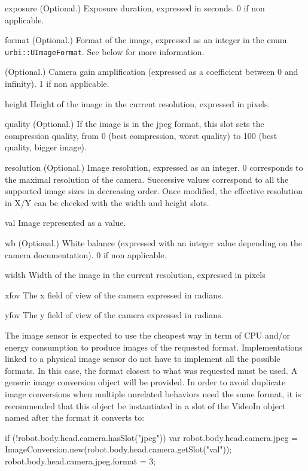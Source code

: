 \begin{urbiscriptapi}
\item[exposure]{} (Optional.) Exposure duration, expressed in seconds. 0 if
  non applicable.


\item[format]{} (Optional.)  Format of the image, expressed as an integer in
  the enum \lstinline{urbi::UImageFormat}.  See below for more information.


\item[gain]{} (Optional.)  Camera gain amplification (expressed as a
  coefficient between 0 and infinity). 1 if non applicable.


\item[height] Height of the image in the current resolution, expressed in
  pixels.


\item[quality]{} (Optional.)  If the image is in the jpeg format, this slot
  sets the compression quality, from 0 (best compression, worst quality) to
  100 (best quality, bigger image).


\item[resolution]{} (Optional.)  Image resolution, expressed as an
  integer. 0 corresponds to the maximal resolution of the camera. Successive
  values correspond to all the supported image sizes in decreasing order.
  Once modified, the effective resolution in X/Y can be checked with the
  width and height slots.


\item[val] Image represented as a  value.


\item[wb]{} (Optional.)  White balance (expressed with an integer value
  depending on the camera documentation). 0 if non applicable.


\item[width] Width of the image in the current resolution, expressed in
  pixels


\item[xfov] The x field of view of the camera expressed in radians.


\item[yfov] The y field of view of the camera expressed in radians.
\end{urbiscriptapi}

The image sensor is expected to use the cheapest way in term of CPU and/or
energy consumption to produce images of the requested format.
Implementations linked to a physical image sensor do not have to implement
all the possible formats. In this case, the format closest to what was
requested must be used.  A generic image conversion object will be
provided. In order to avoid duplicate image conversions when multiple
unrelated behaviors need the same format, it is recommended that this object
be instantiated in a slot of the VideoIn object named after the format it
converts to:
\begin{urbiunchecked}
if (!robot.body.head.camera.hasSlot("jpeg"))
{
  var robot.body.head.camera.jpeg =
    ImageConversion.new(robot.body.head.camera.getSlot("val"));
  robot.body.head.camera.jpeg.format = 3;
}
\end{urbiunchecked}

